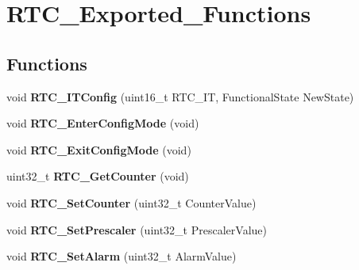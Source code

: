 \hypertarget{group__RTC__Exported__Functions}{
\section{RTC\_\-Exported\_\-Functions}
\label{group__RTC__Exported__Functions}
}
\subsection*{Functions}
\begin{DoxyCompactItemize}
\item 
\hypertarget{group__RTC__Exported__Functions_ga175dfe88866234730c1ec40d2221c4f4}{
void {\bfseries RTC\_\-ITConfig} (uint16\_\-t RTC\_\-IT, FunctionalState NewState)}
\label{group__RTC__Exported__Functions_ga175dfe88866234730c1ec40d2221c4f4}

\item 
\hypertarget{group__RTC__Exported__Functions_ga23612d9da2fe057a0cd72c684e5b438a}{
void {\bfseries RTC\_\-EnterConfigMode} (void)}
\label{group__RTC__Exported__Functions_ga23612d9da2fe057a0cd72c684e5b438a}

\item 
\hypertarget{group__RTC__Exported__Functions_ga7585aa6e2dbb497173b2fd03bac0d304}{
void {\bfseries RTC\_\-ExitConfigMode} (void)}
\label{group__RTC__Exported__Functions_ga7585aa6e2dbb497173b2fd03bac0d304}

\item 
\hypertarget{group__RTC__Exported__Functions_ga6edb19a0ad8414a40610341121c5ea6c}{
uint32\_\-t {\bfseries RTC\_\-GetCounter} (void)}
\label{group__RTC__Exported__Functions_ga6edb19a0ad8414a40610341121c5ea6c}

\item 
\hypertarget{group__RTC__Exported__Functions_gafa81ec17158de1d1a7740eca81b9fb65}{
void {\bfseries RTC\_\-SetCounter} (uint32\_\-t CounterValue)}
\label{group__RTC__Exported__Functions_gafa81ec17158de1d1a7740eca81b9fb65}

\item 
\hypertarget{group__RTC__Exported__Functions_gaf76be6071d1ba65b009e0791069e602c}{
void {\bfseries RTC\_\-SetPrescaler} (uint32\_\-t PrescalerValue)}
\label{group__RTC__Exported__Functions_gaf76be6071d1ba65b009e0791069e602c}

\item 
\hypertarget{group__RTC__Exported__Functions_gaec644c636a30ab5e287ba60ffc77132c}{
void {\bfseries RTC\_\-SetAlarm} (uint32\_\-t AlarmValue)}
\label{group__RTC__Exported__Functions_gaec644c636a30ab5e287ba60ffc77132c}


\end{DoxyCompactItemize}
